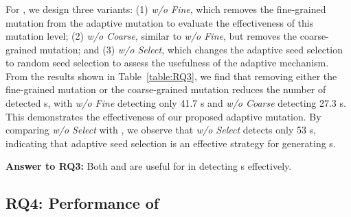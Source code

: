 \subsubsection{\select} For \select, we design three variants: (1) \textit{w/o Fine}, which removes the fine-grained mutation from the adaptive mutation to evaluate the effectiveness of this mutation level; (2) \textit{w/o Coarse}, similar to \textit{w/o Fine}, but removes the coarse-grained mutation; and (3) \textit{w/o Select}, which changes the adaptive seed selection to random seed selection to assess the usefulness of the adaptive mechanism. 
From the results shown in Table~\ref{table:RQ3}, we find that removing either the fine-grained mutation or the coarse-grained mutation reduces the number of detected {\mccs}s, with \textit{w/o Fine} detecting only 41.7 {\mccs}s and \textit{w/o Coarse} detecting 27.3 {\mccs}s. This demonstrates the effectiveness of our proposed adaptive mutation.
By comparing \textit{w/o Select} with \tool, we observe that \textit{w/o Select} detects only 53 {\mccs}s, indicating that adaptive seed selection is an effective strategy for generating {\mccs}s.



\begin{ansbox}
\textbf{Answer to RQ3:} Both \feedback and \select are useful for \tool in detecting {\mccs}s effectively.
\end{ansbox}

\subsection{RQ4: Performance of \tool}
\begin{table}[h]
    \centering
    \caption{Results of time performance in seconds (s). * denotes a negligible minimal value.}
    \vspace{-5pt}
   \vspace{-10pt}
    \label{tab:performace}
\end{table}


